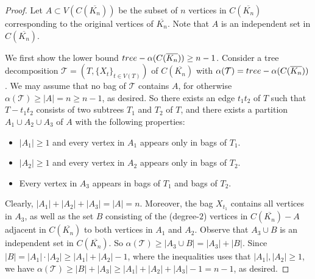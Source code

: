 \documentclass[10pt,a4paper]{amsart}
\newcommand{\T}{\mathcal{T}}
\newcommand{\treea}{{\rm tree}\textnormal{-}\alpha}
\begin{document}
\begin{proof}
    Let $A \subset V(C(\overline{K_n}))$ be the subset of $n$ vertices in $C(\overline{K_n})$ corresponding to the original vertices of $\overline {K_n}$.
    Note that $A$ is an independent set in $C(\overline{K_n})$.
    
    We first show the lower bound $\treea(C(\overline{K_n})) \geq n-1$.
    Consider a tree decomposition $\T = (T,\{X_t\}_{t\in V(T)})$ of $C(\overline{K_n})$ with $\alpha(\T) = \treea(C(\overline{K_n}))$.
    We may assume that no bag of $\T$ contains $A$, for otherwise $\alpha(\T) \geq |A| = n \geq n-1$, as desired.
    So there exists an edge $t_1t_2$ of $T$ such that $T - t_1t_2$ consists of two subtrees $T_1$ and $T_2$ of $T$, and there exists a partition $A_1 \cup A_2 \cup A_3$ of $A$ with the following properties:
    \begin{itemize}
        \item $|A_1| \geq 1$ and every vertex in $A_1$ appears only in bags of $T_1$.
        \item $|A_2| \geq 1$ and every vertex in $A_2$ appears only in bags of $T_2$.
        \item Every vertex in $A_3$ appears in bags of $T_1$ and bags of $T_2$.
    \end{itemize}
    Clearly, $|A_1|+|A_2|+|A_3| = |A| = n$.
    Moreover, the bag $X_{t_1}$ contains all vertices in $A_3$, as well as the set $B$ consisting of the (degree-$2$) vertices in $C(\overline{K_n})-A$ adjacent in $C(\overline{K_n})$ to both vertices in $A_1$ and $A_2$.
    Observe that $A_3 \cup B$ is an independent set in $C(\overline{K_n})$.
    So $\alpha(\T) \geq |A_3 \cup B| = |A_3| + |B|$.
    Since $|B| = |A_1|\cdot |A_2| \geq |A_1|+|A_2|-1$, where the inequalities uses that $|A_1|,|A_2| \geq 1$, we have $\alpha(\T) \geq |B| + |A_3| \geq |A_1|+|A_2|+|A_3|-1 = n-1$, as desired.

    \medskip


\end{proof}
\end{document}
